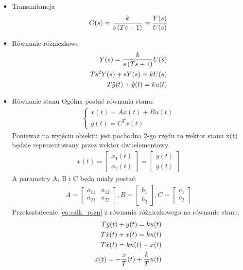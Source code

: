 \documentclass[a4paper,10pt]{article}
\begin{document}
\begin{itemize}
\begin{itemize}
\item Transmitancja	
	\begin{eqnarray}
		G(s)= {k \over {s \left( Ts + 1 \right) }} = {Y(s) \over U(s)}
	\end{eqnarray}
\item Równanie różniczkowe
	\begin{eqnarray} 
		Y(s) = {k \over {s \left( Ts + 1 \right) }} U(s)\\ \label{eq:calk_rozn}
		\nonumber Ts^{2}Y(s) + sY(s) = kU(s)\\
		\nonumber T\ddot{y}(t) + \dot{y}(t) = ku(t)
	\end{eqnarray}
\item Równanie stanu
\newline Ogólna postać równania stanu: %
	\begin{eqnarray}
		\left\{
			\begin{array}{l}
				x(t) = Ax(t) + Bu(t)\\
				y(t) = C^{T}x(t)
			\end{array} \right.
	\end{eqnarray}
Ponieważ na wyjściu obiektu jest pochodna 2-go rzędu to wektor stanu x(t) będzie reprezentowany przez wektor dwuelementowy.
 	\begin{eqnarray}
		\nonumber x(t) = \left[ 
			\begin{array}{l}x_{1}(t)\\
				x_{2}(t)
			\end{array}
		\right] = \left[ 
			\begin{array}{l}
				y(t)\\
				\dot{y}(t)
			\end{array}
		\right]
	\end{eqnarray}
A parametry A, B i C będą miały postać:
	\begin{eqnarray}
		\nonumber A = \left[ 
			\begin{array}{ll} a_{11} & a_{12}\\
				a_{21} & a_{22}
			\end{array}
		\right], B = \left[ 
			\begin{array}{l}
				b_{1}\\
				b_{2}
			\end{array}
		\right], C = \left[ 
			\begin{array}{l}
				c_{1}\\
				c_{2}
			\end{array}
		\right]
	\end{eqnarray}
Przekształcenie \ref{eq:calk_rozn} z równania różniczkowego na równanie stanu: %
	\begin{eqnarray}
		T\dot{y}(t) + y(t) = ku(t)\\
		\nonumber T\dot{x}(t) + x(t) = ku(t)\\
		\nonumber T\dot{x}(t) = ku(t) - x(t)\\
		\nonumber \dot{x}(t) = -{x \over T}(t) + {k \over T}u(t)
	\end{eqnarray}
\end{itemize}


\end{itemize}
\end{document}
